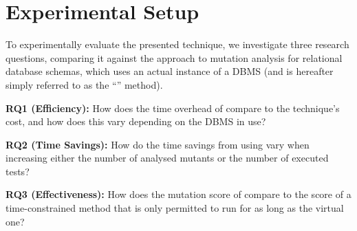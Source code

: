 
\vspace{-.5em}

\section{Experimental Setup}
\label{sec:experimental-setup}


To experimentally evaluate the presented \vma technique, we investigate three research questions, comparing it against
the \Original approach to mutation analysis for relational database schemas, which uses an actual instance of a DBMS
(and is hereafter simply referred to as the ``\Original'' method).


\vspace{5pt}

\noindent
\textbf{RQ1 (Efficiency):} How does the time overhead of \vma compare to the \Standard technique's cost, and how does
this vary depending on the DBMS in use?

\vspace{5pt}

\noindent
\textbf{RQ2 (Time Savings):} How do the time savings from using \vma vary when increasing either the number
of analysed mutants or the number of executed tests?

\vspace{5pt}

\noindent
\textbf{RQ3 (Effectiveness):} How does the mutation score of \vma compare to the score of a time-constrained \Original method that
is only permitted to run for as long as the virtual one?



